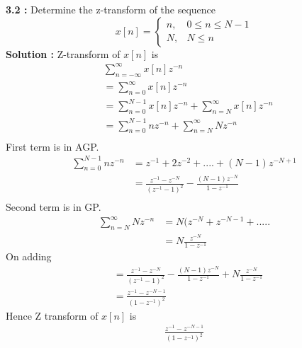 \documentclass[journal,11pt,twocolumn]{IEEEtran}
\begin{document}
\textbf{3.2 : }
Determine the z-transform of the sequence
\begin{equation}
    x[n]= 
    \begin{cases}
    n, &  0 \leq n \leq N-1\\
    N, &  N \leq n
    \end{cases}
\end{equation}
\textbf{Solution :} Z-transform of $x[n]$ is 
\begin{align}
 & \sum_{n=-\infty}^{\infty}x[n]z^{-n}\\
&= \sum_{n=0}^{\infty}x[n]z^{-n}\\
&=  \sum_{n=0}^{N-1}x[n]z^{-n} +  \sum_{n=N}^{\infty}x[n]z^{-n} \\
&=  \sum_{n=0}^{N-1}nz^{-n} +  \sum_{n=N}^{\infty}Nz^{-n}\\
\end{align}
First term is in AGP.
\begin{align}
    \sum_{n=0}^{N-1}nz^{-n} &= z^{-1} + 2z^{-2}+....+ (N-1)z^{-N+1}\\
    &=\frac{z^{-1}-z^{-N}}{(z^{-1}-1)^{2}} - \frac{(N-1)z^{-N}}{1-z^{-1}}\\ 
\end{align}
Second term is in GP.
\begin{align}
    \sum_{n=N}^{\infty}Nz^{-n} &= N(z^{-N}  + z^{-N-1}+.....\\
    &= N\frac{z^{-N}}{1-z^{-1}}
\end{align}
On adding 
\begin{align}
  &=  \frac{z^{-1}-z^{-N}}{(z^{-1}-1)^{2}} - \frac{(N-1)z^{-N}}{1-z^{-1}} +  N\frac{z^{-N}}{1-z^{-1}}\\
  &= \frac{z^{-1}-z^{-N-1}}{(1-z^{-1})^{2}}
\end{align}
Hence Z transform of $x[n]$ is
\begin{align}
\frac{z^{-1}-z^{-N-1}}{(1-z^{-1})^{2}}
\end{align}
\end{document}
